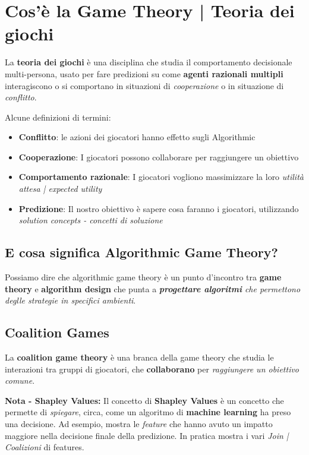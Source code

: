 \section{Cos'è la Game Theory | Teoria dei giochi}
\label{sec:cos_e_la_game_theory_teoria_dei_giochi}

La \textbf{teoria dei giochi} è una disciplina che studia il comportamento
decisionale multi-persona, usato per fare predizioni su come \textbf{agenti
    razionali multipli} interagiscono o si comportano in situazioni di
\textit{cooperazione} o in situazione di \textit{conflitto}.

Alcune definizioni di termini:
\begin{itemize}
    \item \textbf{Conflitto}: le azioni dei giocatori hanno effetto sugli Algorithmic
    \item \textbf{Cooperazione}: I giocatori possono collaborare per raggiungere un obiettivo
    \item \textbf{Comportamento razionale}: I giocatori vogliono massimizzare la loro \textit{utilità attesa | expected utility}
    \item \textbf{Predizione}: Il nostro obiettivo è sapere cosa faranno i giocatori, utilizzando \textit{solution concepts - concetti di soluzione}
\end{itemize}

\subsection{E cosa significa Algorithmic Game Theory?}
\label{sub:e_cosa_significa_algorithmic_game_theory}

Possiamo dire che algorithmic game theory è un punto d'incontro tra
\textbf{game theory} e \textbf{algorithm design} che punta a
\textit{\textbf{progettare algoritmi} che permettono deglle strategie in
    specifici ambienti}.

\subsection{Coalition Games}
\label{sub:coalition_game_theory}

La \textbf{coalition game theory} è una branca della game theory che studia le
interazioni tra gruppi di giocatori, che \textbf{collaborano} per
\textit{raggiungere un obiettivo comune}.

\textbf{Nota - Shapley Values:} Il concetto di \textbf{Shapley Values} è un concetto che permette di \textit{spiegare}, circa,
come un algoritmo di \textbf{machine learning} ha preso una decisione. Ad esempio, mostra
le \textit{feature} che hanno avuto un impatto maggiore nella decisione finale della predizione. In pratica mostra i vari
\textit{Join | Coalizioni} di features.

